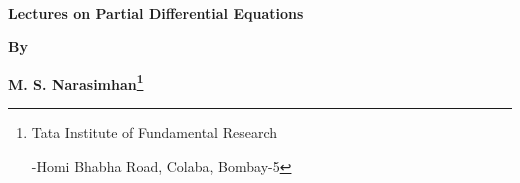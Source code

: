 \thispagestyle{empty}

~\phantom{a}
\vfill

\begin{center}
{\Large\bf Lectures on Partial Differential Equations}\\[5pt]
\vskip 1cm

{\bf By}
\medskip

{\large\bf M. S. Narasimhan\footnote[1]{Tata Institute of Fundamental Research

-Homi Bhabha Road, Colaba, Bombay-5}}
\end{center}
\vfill

\eject


